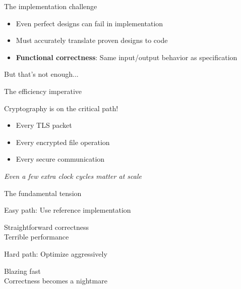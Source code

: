 \documentclass[aspectratio=169, lualatex, handout]{beamer}
\begin{document}
\begin{frame}{The implementation challenge}
	\begin{itemize}
		\item Even perfect designs can fail in implementation
		\item Must accurately translate proven designs to code
		\item \textbf{Functional correctness}: Same input/output behavior as specification
	\end{itemize}
	\vspace{1em}
	\begin{center}
		\Large
		But that's not enough...
	\end{center}
\end{frame}

\begin{frame}{The efficiency imperative}
	\begin{center}
		\Large
		Cryptography is on the critical path!
	\end{center}
	\vspace{1em}
	\begin{itemize}
		\item Every TLS packet
		\item Every encrypted file operation
		\item Every secure communication
	\end{itemize}
	\vspace{0.5em}
	\begin{center}
		\textit{Even a few extra clock cycles matter at scale}
	\end{center}
\end{frame}

\begin{frame}{The fundamental tension}
	\begin{center}
		\Large
		Easy path: Use reference implementation

		\vspace{0.5em}

		\normalsize
		\mycheckmark Straightforward correctness \\
		\times Terrible performance
	\end{center}
	\vspace{1em}
	\begin{center}
		\Large
		Hard path: Optimize aggressively

		\vspace{0.5em}

		\normalsize
		\mycheckmark Blazing fast \\
		\times Correctness becomes a nightmare
	\end{center}
\end{frame}
\end{document}
